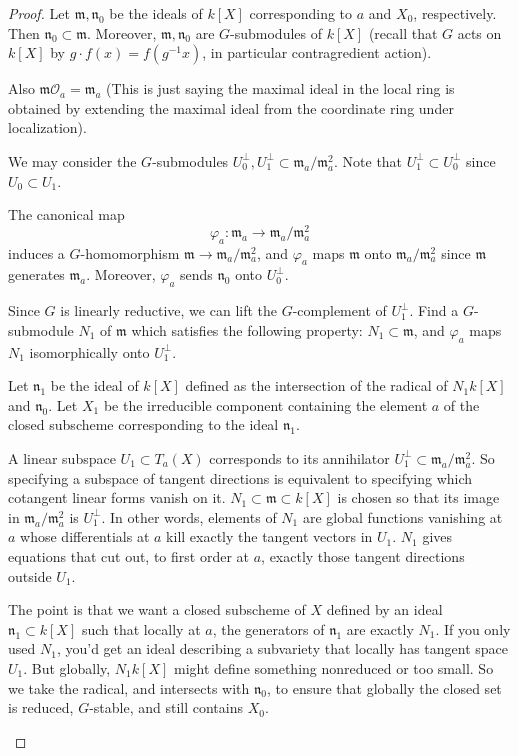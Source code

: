 \documentclass[12pt]{article}
\begin{document}
\begin{proof}
Let $\mathfrak{m}, \mathfrak{n}_0$ be the ideals of $k[X]$ corresponding to $a$ and $X_0$, respectively.  
Then $\mathfrak{n}_0 \subset \mathfrak{m}$. Moreover, $\mathfrak{m}, \mathfrak{n}_0$ are $G$-submodules of $k[X]$ (recall that $G$ acts on $k[X]$ by $g\cdot f(x) = f(g^{-1}x)$, in particular contragredient action).

Also $\mathfrak{m}\mathcal{O}_a = \mathfrak{m}_a$ (This is just saying the maximal ideal in the local ring is obtained by extending the maximal ideal from the coordinate ring under localization).

We may consider the $G$-submodules $U_0^\perp, U_1^\perp \subset \mathfrak{m}_a / \mathfrak{m}_a^2$. Note that $U_1^\perp \subset U_0^\perp$ since $U_0 \subset U_1$.

The canonical map
\[
   \varphi_a : \mathfrak{m}_a \longrightarrow \mathfrak{m}_a / \mathfrak{m}_a^2
\]
induces a $G$-homomorphism $\mathfrak{m} \to \mathfrak{m}_a / \mathfrak{m}_a^2$, and $\varphi_a$ maps $\mathfrak{m}$ onto $\mathfrak{m}_a / \mathfrak{m}_a^2$ since $\mathfrak{m}$ generates $\mathfrak{m}_a$.  
Moreover, $\varphi_a$ sends $\mathfrak{n}_0$ onto $U_0^\perp$.  

Since $G$ is linearly reductive, we can lift the $G$-complement of $U_1^\perp$. Find a $G$-submodule $N_1$ of $\mathfrak{m}$ which satisfies the following property: $N_1 \subset \mathfrak{m}$, and $\varphi_a$ maps $N_1$ isomorphically onto $U_1^\perp$.  

Let $\mathfrak{n}_1$ be the ideal of $k[X]$ defined as the intersection of the radical of $N_1k[X]$ and $\mathfrak{n}_0$.  
Let $X_1$ be the irreducible component containing the element $a$ of the closed subscheme corresponding to the ideal $\mathfrak{n}_1$.  
\begin{remark}
A linear subspace $U_1 \subset T_a(X)$ corresponds to its annihilator $U_1^\perp \subset \mathfrak{m}_a/\mathfrak{m}_a^2$. So specifying a subspace of tangent directions is equivalent to specifying which cotangent linear forms vanish on it. $N_1 \subset \mathfrak{m} \subset k[X]$ is chosen so that its image in $\mathfrak{m}_a/\mathfrak{m}_a^2$ is $U_1^\perp$. In other words, elements of $N_1$ are global functions vanishing at $a$ whose differentials at $a$ kill exactly the tangent vectors in $U_1$. $N_1$ gives equations that cut out, to first order at $a$, exactly those tangent directions outside $U_1$.

The point is that we want a closed subscheme of $X$ defined by an ideal $\mathfrak{n}_1 \subset k[X]$ such that locally at $a$, the generators of $\mathfrak{n}_1$ are exactly $N_1$. If you only used $N_1$, you’d get an ideal describing a subvariety that locally has tangent space $U_1$. But globally, $N_1 k[X]$ might define something nonreduced or too small. So we take the radical, and intersects with $\mathfrak{n}_0$, to ensure that globally the closed set is reduced, $G$-stable, and still contains $X_0$.
\end{remark}





\end{proof}
\end{document}
